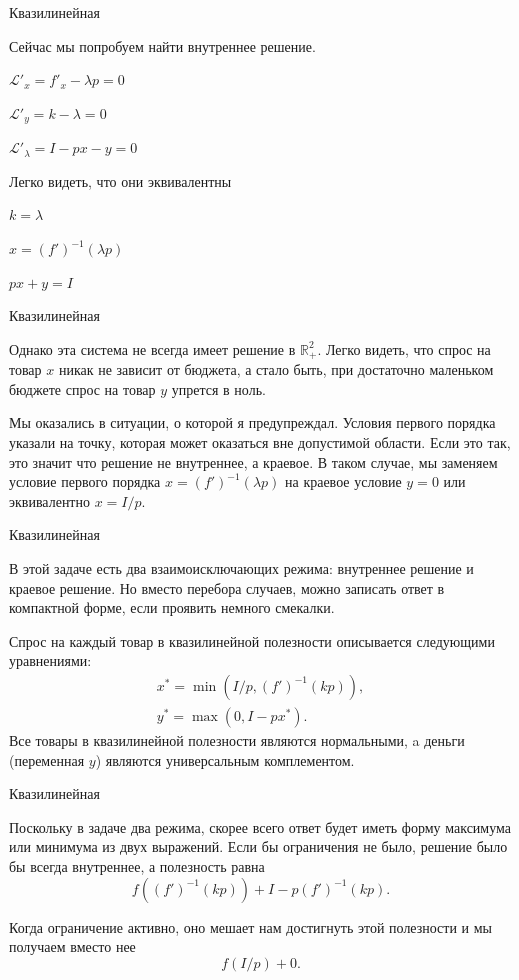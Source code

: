 \documentclass{beamer}
\begin{document}
\begin{frame}{Квазилинейная}

Сейчас мы попробуем найти внутреннее решение.

$\mathcal{L}'_x = f'_x - \lambda p = 0$

$\mathcal{L}'_y = k - \lambda = 0$

$\mathcal{L}'_{\lambda} = I - p x - y= 0$

Легко видеть, что они эквивалентны

$k = \lambda$

$x = (f')^{-1}(\lambda p)$

$px + y = I$

\end{frame}

\begin{frame}{Квазилинейная}

Однако эта система не всегда имеет решение в $\mathbb{R}^2_{+}$. Легко видеть, что спрос на товар $x$ никак не зависит от бюджета, а стало быть, при достаточно маленьком бюджете спрос на товар $y$ упрется в ноль.

Мы оказались в ситуации, о которой я предупреждал. Условия первого порядка указали на точку, которая может оказаться вне допустимой области. Если это так, это значит что решение не внутреннее, а краевое. В таком случае, мы заменяем условие первого порядка  $x = (f')^{-1}(\lambda p)$ на краевое условие $y=0$ или эквивалентно $x = I/p$.

\end{frame}


\begin{frame}{Квазилинейная}

В этой задаче есть два взаимоисключающих режима: внутреннее решение и краевое решение. Но вместо перебора случаев, можно записать ответ в компактной форме, если проявить немного смекалки.

Спрос на каждый товар в квазилинейной полезности описывается следующими уравнениями:
\begin{gather*}
x^{\ast} = \min (I/p, (f')^{-1}(k p)), \\
y^{\ast} = \max (0, I-px^{\ast}).
\end{gather*}
Все товары в квазилинейной полезности являются нормальными, a деньги (переменная $y$) являются универсальным комплементом.
\end{frame}

\begin{frame}{Квазилинейная}

Поскольку в задаче два режима, скорее всего ответ будет иметь форму максимума или минимума из двух выражений. Если бы ограничения не было, решение было бы всегда внутреннее, а полезность равна 
$$f((f')^{-1}(k p)) + I - p (f')^{-1}(k p).$$

Когда ограничение активно, оно мешает нам достигнуть этой полезности и мы получаем вместо нее
$$ f(I/p) + 0.$$

\end{frame}
\end{document}
